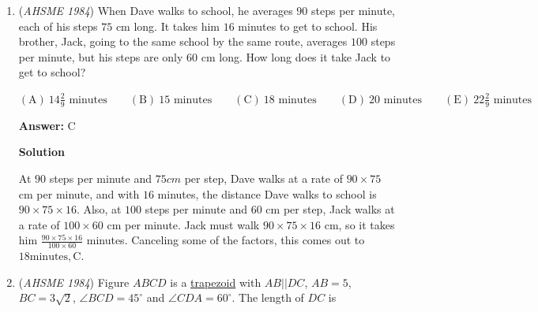 \begin{enumerate}
 $\mathrm{(A) \ }31b \qquad \mathrm{(B) \ }\frac{37}{27}b \qquad \mathrm{(C) \ } 13g \qquad \mathrm{(D) \ }\frac{37}{27}g \qquad \mathrm{(E) \ } \frac{37}{27}t$

 \textbf{Answer: }B



\textbf{Solution}

From the given, we have $3g=b$ and $9t=g$, or $t=\frac{g}{9}$. The sum of these, in terms of $g$, is $3g+g+\frac{g}{9}$, or, with a common \href{https://artofproblemsolving.com/wiki/index.php?title=Denominator}{denominator}, $\frac{37g}{9}$. We can see that this isn't one of the choices. So we write it in terms of $b$. We can see from the first \href{https://artofproblemsolving.com/wiki/index.php?title=Equation}{equation} that $g=\frac{b}{3}$, so substituting this into the expression yields $\frac{37b}{27}, \boxed{\text{B}}$.

 


	\item (\textit{AHSME 1984}) When Dave walks to school, he averages $90$ steps per minute, each of his steps $75$ cm long. It takes him $16$ minutes to get to school. His brother, Jack, going to the same school by the same route, averages $100$ steps per minute, but his steps are only $60$ cm long. How long does it take Jack to get to school?


 $\mathrm{(A) \ }14 \frac{2}{9} \text{ minutes} \qquad \mathrm{(B) \ }15 \text{ minutes}\qquad \mathrm{(C) \ } 18 \text{ minutes}\qquad \mathrm{(D) \ }20 \text{ minutes} \qquad \mathrm{(E) \ } 22 \frac{2}{9} \text{ minutes}$

 \textbf{Answer: }C



\textbf{Solution}

At $90$ steps per minute and $75 cm$ per step, Dave walks at a rate of $90\times75$ cm per minute, and with $16$ minutes, the distance Dave walks to school is $90\times75\times16$. Also, at $100$ steps per minute and $60$ cm per step, Jack walks at a rate of $100\times60$ cm per minute. Jack must walk $90\times75\times16$ cm, so it takes him $\frac{90\times75\times16}{100\times60}$ minutes. Canceling some of the factors, this comes out to $18 \text{minutes}, \boxed{\text{C}}$.

 


	\item (\textit{AHSME 1984}) Figure $ABCD$ is a \href{https://artofproblemsolving.com/wiki/index.php?title=Trapezoid}{trapezoid} with $AB||DC$, $AB=5$, $BC=3\sqrt{2}$, $\angle BCD=45^\circ$ and $\angle CDA=60^\circ$. The length of $DC$ is



\end{enumerate}
